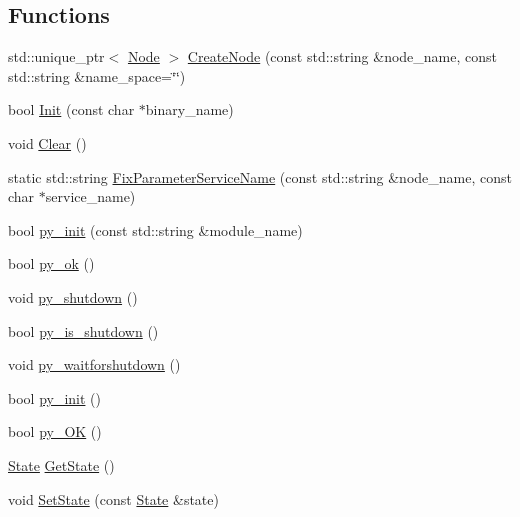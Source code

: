 \subsection*{Functions}
\begin{DoxyCompactItemize}
\item 
std\-::unique\-\_\-ptr$<$ \hyperlink{classapollo_1_1cyber_1_1Node}{Node} $>$ \hyperlink{namespaceapollo_1_1cyber_ae369c5de0279f2a5745d0438d532bc89}{Create\-Node} (const std\-::string \&node\-\_\-name, const std\-::string \&name\-\_\-space=\char`\"{}\char`\"{})
\item 
bool \hyperlink{namespaceapollo_1_1cyber_a2d055a81b338116634deaf8ac3367aca}{Init} (const char $\ast$binary\-\_\-name)
\item 
void \hyperlink{namespaceapollo_1_1cyber_aa650c5e029a26f664e673bf531568587}{Clear} ()
\item 
static std\-::string \hyperlink{namespaceapollo_1_1cyber_af63444d43dbf5f1a89a81210ac7920c0}{Fix\-Parameter\-Service\-Name} (const std\-::string \&node\-\_\-name, const char $\ast$service\-\_\-name)
\item 
bool \hyperlink{namespaceapollo_1_1cyber_a7caf94c4c329a1ea887b8e63d9fd4f06}{py\-\_\-init} (const std\-::string \&module\-\_\-name)
\item 
bool \hyperlink{namespaceapollo_1_1cyber_abd24f3821f63664f41ed40709a244046}{py\-\_\-ok} ()
\item 
void \hyperlink{namespaceapollo_1_1cyber_a64e717405c199e946244d9c0b592f1b4}{py\-\_\-shutdown} ()
\item 
bool \hyperlink{namespaceapollo_1_1cyber_a45ff4d9ff56122323eeace26d4266666}{py\-\_\-is\-\_\-shutdown} ()
\item 
void \hyperlink{namespaceapollo_1_1cyber_a691828bf6510169ccd3a53ec0787e812}{py\-\_\-waitforshutdown} ()
\item 
bool \hyperlink{namespaceapollo_1_1cyber_a9e6c8c025e1d5e84455fed7abdc7c671}{py\-\_\-init} ()
\item 
bool \hyperlink{namespaceapollo_1_1cyber_a89788e677041dfcd9ead48b7c6cad5c4}{py\-\_\-\-O\-K} ()
\item 
\hyperlink{namespaceapollo_1_1cyber_a97c79b3d3aae7ac07954617b97cadaa6}{State} \hyperlink{namespaceapollo_1_1cyber_ace784b93a164404b7ee9de2ab8a2a9f8}{Get\-State} ()
\item 
void \hyperlink{namespaceapollo_1_1cyber_a47936e1951f9dbe07210276e2573c755}{Set\-State} (const \hyperlink{namespaceapollo_1_1cyber_a97c79b3d3aae7ac07954617b97cadaa6}{State} \&state)
\item 

\end{DoxyCompactItemize}
